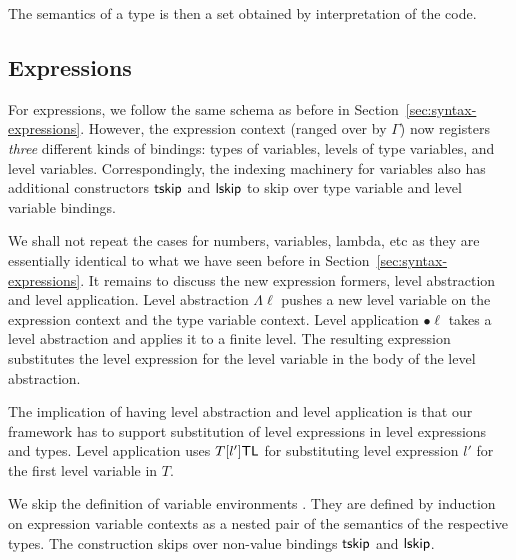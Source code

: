 \documentclass[manuscript,screen,review,anonymous]{acmart}
\begin{document}
The semantics of a type is then a set obtained by interpretation of
the code.

\IRTSem

\subsection{Expressions}
\label{sec:expressions}

For expressions, we follow the same schema as before in
Section~\ref{sec:syntax-expressions}. However, the expression context
(ranged over by $\Gamma$)
now registers \emph{three} different kinds of bindings: types of
variables, levels of type variables, and level variables.
Correspondingly, the indexing machinery for variables also has
additional constructors $\Atskip$ and $\Alskip$ to skip over type
variable and level variable bindings.

\begin{minipage}{0.45\linewidth}
  \IREEnv
\end{minipage}
\begin{minipage}{0.45\linewidth}
  \IREEnvNi
\end{minipage}

We shall not repeat the cases for numbers, variables, lambda, etc as
they are essentially identical to what we have seen before in
Section~\ref{sec:syntax-expressions}. It remains to discuss the new
expression formers, level abstraction and level application.
Level abstraction $\Lambda\ell$ pushes a new level variable on the
expression context and the type variable context. Level application
$\bullet\ell$ takes a level abstraction and applies it to a finite
level. The resulting expression substitutes the level expression for
the level variable in the body of the level abstraction.

The implication of having level abstraction and level application is
that our framework has to support substitution of level expressions in
level expressions and types.  Level application uses $T [ l' ]\ATL$
for substituting level expression $l'$ for the first level variable in $T$.

\IRExpr

We skip the definition of variable environments
\IRTEnvSemDisplay. They are defined by 
induction on expression variable contexts as a nested pair of the
semantics of the respective types. The construction skips over
non-value bindings $\Atskip$ and $\Alskip$.
\end{document}
